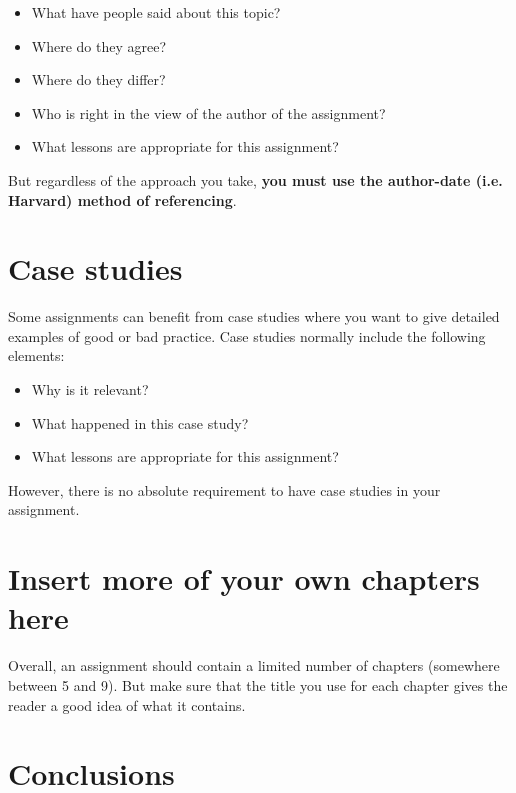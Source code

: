 \documentclass{bcrre_assignment}
\begin{document}
\begin{itemize}
    \item What have people said about this topic?
    \item Where do they agree?
    \item Where do they differ?
    \item Who is right in the view of the author of the assignment?
    \item What lessons are appropriate for this assignment?
\end{itemize}

But regardless of the approach you take, \textbf{you must use the author-date (i.e. Harvard) method of referencing}.

\chapter{Case studies}
Some assignments can benefit from case studies where you want to give detailed examples of good or bad practice.  Case studies normally include the following elements:

\begin{itemize}
    \item Why is it relevant?
    \item What happened in this case study?
    \item What lessons are appropriate for this assignment?
\end{itemize}

However, there is no absolute requirement to have case studies in your assignment. 


\chapter{Insert more of your own chapters here}
Overall, an assignment should contain a limited number of chapters (somewhere between 5 and 9).  But make sure that the title you use for each chapter gives the reader a good idea of what it contains. 

\chapter{Conclusions}
\end{document}
